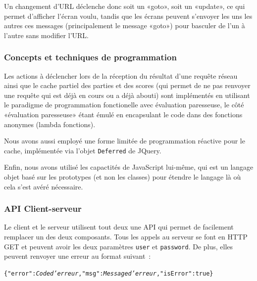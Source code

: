 \documentclass[a4paper,11pt,french]{article}
\begin{document}
Un changement d'URL déclenche donc soit un «goto», soit un «update», ce qui permet d'afficher l'écran voulu, tandis que les écrans peuvent
s'envoyer les uns les autres ces messages (principalement le message «goto») pour basculer de l'un à l'autre sans modifier l'URL.

\subsubsection{Concepts et techniques de programmation}

Les actions à déclencher lors de la réception du résultat d'une requête réseau ainsi que le cache partiel des parties et des scores (qui
permet de ne pas renvoyer une requête qui est déjà en cours ou a déjà abouti) sont implémentés en utilisant le paradigme de programmation
fonctionelle avec évaluation paresseuse, le côté «évaluation paresseuse» étant émulé en encapsulant le code dans des fonctions anonymes
(lambda fonctions).

Nous avons aussi employé une forme limitée de programmation réactive pour le cache, implémentée via l'objet \verb!Deferred! de JQuery.

Enfin, nous avons utilisé les capactités de JavaScript lui-même, qui est un langage objet basé sur les prototypes (et non les classes) pour
étendre le langage là où cela s'est avéré nécessaire.

\subsubsection{API Client-serveur}
Le client et le serveur utilisent tout deux une API qui permet de facilement remplacer un des deux composants. Tous les appels au serveur se font en HTTP GET et peuvent avoir les deux paramètres \verb!user! et \verb!password!. De plus, elles peuvent renvoyer une erreur au format suivant~:
\begin{alltt}
\{"error":\textit{Code d'erreur}, "msg":\textit{Message d'erreur}, "isError":true\}
\end{alltt}
\end{document}
